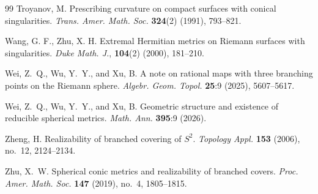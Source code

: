 \documentclass[microtype]{gtpart}     %
\theoremstyle{definition}
\begin{document}
\begin{thebibliography}{99}
Troyanov, M.
Prescribing curvature on compact surfaces with conical singularities.
\textit{Trans. Amer. Math. Soc.} \textbf{324}(2) (1991), 793--821.


Wang, G. F., Zhu, X. H. Extremal Hermitian metrics on Riemann surfaces with singularities. \emph{Duke Math. J.}, \textbf{104}(2) (2000), 181--210.


Wei, Z.~Q., Wu, Y.~Y., and Xu, B.
A note on rational maps with three branching points on the Riemann sphere.
\textit{Algebr. Geom. Topol.} \textbf{25}:9 (2025), 5607--5617.

Wei, Z.~Q., Wu, Y.~Y., and Xu, B.
Geometric structure and existence of reducible spherical metrics.
\textit{Math. Ann.} \textbf{395}:9 (2026).




Zheng, H.
Realizability of branched covering of $S^{2}$.
\textit{Topology Appl.} \textbf{153} (2006), no.~12, 2124--2134.

Zhu, X.~W.
Spherical conic metrics and realizability of branched covers.
\textit{Proc. Amer. Math. Soc.} \textbf{147} (2019), no.~4, 1805--1815.

\end{thebibliography}
\end{document}
